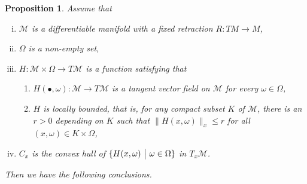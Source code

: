 \documentclass{amsart}
\newcommand{\M}{\mathcal{M}}
\theoremstyle{plain}
\newtheorem{proposition}[theorem]{Proposition}
\theoremstyle{definition}
\theoremstyle{remark}
\numberwithin{theorem}{section}
\numberwithin{equation}{section}
\begin{document}
\begin{proposition}\label{prop-confine-compact}
Assume that
\begin{enumerate}[(i)]
	\item $\M$ is a differentiable manifold with a fixed retraction $R:TM\rightarrow M$,
	\item $\Omega$ is a non-empty set,
	\item $H:\M\times \Omega \rightarrow T\M$ is a function satisfying that 
	\begin{enumerate}
		\item $H(\bullet, \omega): \M\rightarrow T\M$ is a tangent vector field on $\M$ for every $\omega \in \Omega$,
		\item $H$ is locally bounded, that is, for any compact subset $K$ of $\M$, there is an $r>0$ depending on $K$ such that $\|H(x,\omega)\|_x\leq r$ for all $(x,\omega) \in K \times \Omega$,
	\end{enumerate}
	\item $C_x$ is the convex hull of $\{H(x,\omega)~\big{|}~\omega \in \Omega\}$ in $T_x \M$.
\end{enumerate}
Then we have the following conclusions.


\end{proposition}
\end{document}
